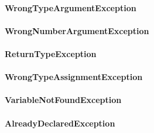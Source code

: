 \documentclass[parskip=full]{scrartcl}
\begin{document}
\paragraph{WrongTypeArgumentException}
\paragraph{WrongNumberArgumentException}
\paragraph{ReturnTypeException}
\paragraph{WrongTypeAssignmentException}
\paragraph{VariableNotFoundException}
\paragraph{AlreadyDeclaredException}
\end{document}
